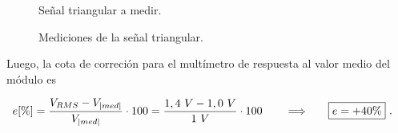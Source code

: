       \begin{figure}[H]
        \centering
        \caption{Señal triangular a medir.}
        \label{fig:SeñalTriangular}
      \end{figure}

      \begin{figure}[H]
        \centering
        \caption{Mediciones de la señal triangular.}
        \label{fig:MedicionSeñalTriangular}
      \end{figure}

      Luego, la cota de correción para el multímetro de respuesta al 
      valor medio del módulo es

      \begin{align*}
        e [\%] = \dfrac{V_{RMS} - V_{|med|}}{V_{|med|}} \cdot 100
               = \dfrac{1,4~V - 1,0~V}{1~V} \cdot 100
               \hspace{20pt} \Longrightarrow \hspace{20pt} \Aboxed{e = +40\%}~.
      \end{align*}


  
